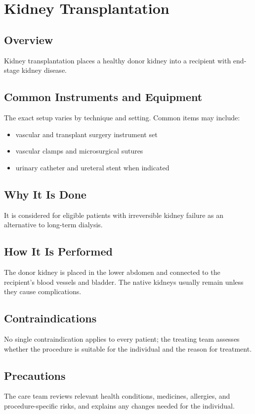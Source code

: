 \chapter{Kidney Transplantation}
\section*{Overview}
Kidney transplantation places a healthy donor kidney into a recipient with end-stage kidney disease.
\section*{Common Instruments and Equipment}
The exact setup varies by technique and setting. Common items may include:
\begin{itemize}[nosep,leftmargin=*]
  \item vascular and transplant surgery instrument set
  \item vascular clamps and microsurgical sutures
  \item urinary catheter and ureteral stent when indicated
\end{itemize}

\section*{Why It Is Done}
It is considered for eligible patients with irreversible kidney failure as an alternative to long-term dialysis.
\section*{How It Is Performed}
The donor kidney is placed in the lower abdomen and connected to the recipient's blood vessels and bladder. The native kidneys usually remain unless they cause complications.
\section*{Contraindications}
No single contraindication applies to every patient; the treating team assesses whether the procedure is suitable for the individual and the reason for treatment.

\section*{Precautions}
The care team reviews relevant health conditions, medicines, allergies, and procedure-specific risks, and explains any changes needed for the individual.

